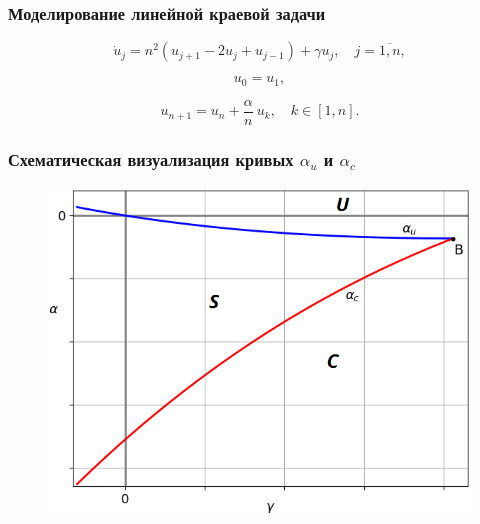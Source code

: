 \documentclass[fullscreen=true, unicode, bookmarks=false]{beamer}
\begin{document}
\begin{frame}
\frametitle{ Моделирование линейной краевой задачи }

\begin{equation}\label{numeric_problem} 
	\dot{u}_j =  n^2(u_{j+1} - 2u_j + u_{j-1}) + \gamma u_j, \quad j = \overline{1, n}, 
\end{equation}

\vfill

$$ u_0 = u_1, $$

$$ u_{n+1} = u_n + \frac{\alpha}{n}\:u_k, \quad k \in [1,n]. $$

\end{frame}

\begin{frame}
\frametitle{ Схематическая визуализация кривых $ \alpha_u $ и $ \alpha_c $ }

\begin{figure}[h]
\includegraphics[scale=0.6]{scheme.png} 
\end{figure}

\end{frame}
\end{document}
